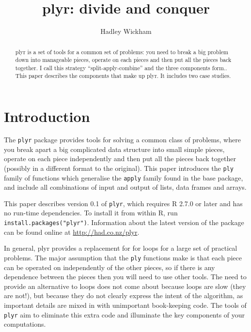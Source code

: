 \documentclass{scrartcl}
\title{plyr: divide and conquer}
\author{Hadley Wickham}
\begin{document}
\maketitle

%


\begin{abstract}
plyr is a set of tools for a common set of problems: you need to break a big problem down into manageable pieces, operate on each pieces and then put all the pieces back together.  I call this strategy ``split-apply-combine'' and the three components form..   This paper describes the components that make up plyr.  It includes two case studies.
\end{abstract}

\section{Introduction}

The {\tt plyr} package provides tools for solving a common class of problems, where you break apart a big complicated data structure into small simple pieces, operate on each piece independently and then put all the pieces back together (possibly in a different format to the original).  This paper introduces the {\tt ply} family of functions which generalise the {\tt apply} family found in the base package, and include all combinations of input and output of lists, data frames and arrays.

This paper describes version 0.1 of {\tt plyr}, which requires R 2.7.0 or later and has no run-time dependencies.  To install it from within R, run {\tt install.packages("plyr")}.  Information about the latest version of the package can be found online at \url{http://had.co.nz/plyr}.  


In general, plyr provides a replacement for for loops for a large set of practical problems.  The major assumption that the {\tt ply} functions make is that each piece can be operated on independently of the other pieces, so if there is any dependence between the pieces then you will need to use other tools.  The need to provide an alternative to loops does not come about because loops are slow (they are not!), but because they do not clearly express the intent of the algorithm, as important details are mixed in with unimportant book-keeping code. The tools of {\tt plyr} aim to eliminate this extra code and illuminate the key components of your computations.
\end{document}
